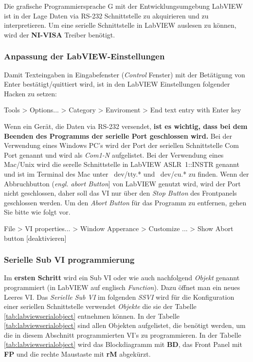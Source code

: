 \documentclass[
fontsize=12pt, 
paper=a4, 
BCOR=10mm, 
twoside=false,
 DIV=10, 
 headsepline, 
 footsepline
 ]{scrartcl}
\begin{document}
Die grafische Programmiersprache G mit der Entwicklungsumgebung LabVIEW ist in der Lage Daten via RS-232 Schnittstelle zu akquirieren und zu interpretieren. Um eine serielle Schnittstelle in LabVIEW auslesen zu können, wird der \textbf{NI-VISA} Treiber benötigt. \\

\subsubsection{Anpassung der LabVIEW-Einstellungen}
\label{sec:LabVIEW_Einstellungen}

Damit Texteingaben in Eingabefenster (\textit{Control} Fenster) mit der Betätigung von Enter bestätigt/quittiert wird, ist in den LabVIEW Einstellungen folgender Hacken zu setzen:

\begin{center} 
Tools > Options... > Category > Enviroment > End text entry with Enter key
\end{center} 

Wenn ein Gerät, die Daten via RS-232 versendet, \textbf{ist es wichtig, dass bei dem Beenden des Programms der serielle Port geschlossen wird.} Bei der Verwendung eines Windows PC's wird der Port der seriellen Schnittstelle Com Port genannt und wird als \textit{Com1-N} aufgelistet. Bei der Verwendung eines Mac/Unix wird die serelle Schnittstelle in LabVIEW \mbox{ASLR 1::INSTR} genannt und ist im Terminal des Mac unter ~dev/tty.* und ~dev/cu.* zu finden. Wenn der Abbruchbutton (\textit{engl. abort Button}] von LabVIEW genutzt wird, wird der Port nicht geschlossen, daher soll das VI nur über den \textit{Stop Button} des Frontpanels geschlossen werden. Um den \textit{Abort Button} für das Programm zu entfernen, gehen Sie bitte wie folgt vor.

\begin{center} 
File > VI properties... > Window Apperance > Customize ... >  Show Abort button [deaktivieren]
\end{center} 
 
\subsubsection{Serielle Sub VI programmierung}

Im \textbf{ersten Schritt} wird ein Sub VI oder wie auch nachfolgend \textit{Objekt} genannt programmiert (in LabVIEW auf englisch \textit{Function}). Dazu öffnet man ein neues Leeres VI. Das \textit{Serielle Sub VI} im folgenden \textit{SSVI} wird für die Konfiguration einer seriellen Schnittstelle verwendet \textit{Objekte} die sie der Tabelle \ref{tab:labviewserialobject} entnehmen können. In der Tabelle \ref{tab:labviewserialobject} sind allen Objekten aufgelistet, die benötigt werden, um die in diesem Abschnitt programmierten VI's zu programmieren. In der Tabelle \ref{tab:labviewserialobject} wird das Blockdiagramm mit \textbf{BD}, das Front Panel mit \textbf{FP} und die rechte Maustaste mit \textbf{rM} abgekürzt.\\
\end{document}
